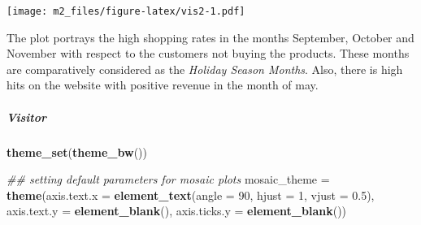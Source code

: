 \documentclass[
]{article}
\newenvironment{Shaded}{\begin{snugshade}}{\end{snugshade}}
\newcommand{\CommentTok}[1]{\textcolor[rgb]{0.56,0.35,0.01}{\textit{#1}}}
\newcommand{\DataTypeTok}[1]{\textcolor[rgb]{0.13,0.29,0.53}{#1}}
\newcommand{\DecValTok}[1]{\textcolor[rgb]{0.00,0.00,0.81}{#1}}
\newcommand{\FloatTok}[1]{\textcolor[rgb]{0.00,0.00,0.81}{#1}}
\newcommand{\KeywordTok}[1]{\textcolor[rgb]{0.13,0.29,0.53}{\textbf{#1}}}
\newcommand{\NormalTok}[1]{#1}
\newcommand{\OperatorTok}[1]{\textcolor[rgb]{0.81,0.36,0.00}{\textbf{#1}}}
\newcommand{\StringTok}[1]{\textcolor[rgb]{0.31,0.60,0.02}{#1}}
\begin{document}
\begin{Shaded}
\end{Shaded}

\texttt{[image: m2\_files/figure-latex/vis2-1.pdf]}

The plot portrays the high shopping rates in the months September,
October and November with respect to the customers not buying the
products. These months are comparatively considered as the \emph{Holiday
Season Months}. Also, there is high hits on the website with positive
revenue in the month of may.

\hypertarget{visitor}{%
\subparagraph{Visitor}\label{visitor}}

\begin{Shaded}
\begin{Highlighting}[]
\KeywordTok{theme_set}\NormalTok{(}\KeywordTok{theme_bw}\NormalTok{())}

\CommentTok{## setting default parameters for mosaic plots}
\NormalTok{mosaic_theme =}\StringTok{ }\KeywordTok{theme}\NormalTok{(}\DataTypeTok{axis.text.x =} \KeywordTok{element_text}\NormalTok{(}\DataTypeTok{angle =} \DecValTok{90}\NormalTok{,}
                                                \DataTypeTok{hjust =} \DecValTok{1}\NormalTok{,}
                                                \DataTypeTok{vjust =} \FloatTok{0.5}\NormalTok{),}
                     \DataTypeTok{axis.text.y =} \KeywordTok{element_blank}\NormalTok{(),}
                     \DataTypeTok{axis.ticks.y =} \KeywordTok{element_blank}\NormalTok{())}
\end{Highlighting}
\end{Shaded}
\end{document}

